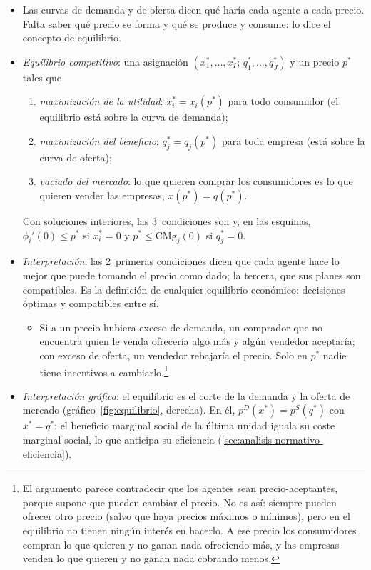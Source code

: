 \documentclass[11pt]{article}
\begin{document}
\begin{itemize}
\item Las curvas de demanda y de oferta dicen qué haría cada agente a cada precio. Falta saber qué precio se forma y qué se produce y consume: lo dice el concepto de equilibrio.
\item \emph{Equilibrio competitivo}: una asignación $(x_1^*,\dots,x_I^*;\,q_1^*,\dots,q_J^*)$ y un precio $p^*$ tales que
  \begin{enumerate}
  \item \emph{maximización de la utilidad}: $x_i^*=x_i(p^*)$ para todo consumidor (el equilibrio está sobre la curva de demanda);
  \item \emph{maximización del beneficio}: $q_j^*=q_j(p^*)$ para toda empresa (está sobre la curva de oferta);
  \item \emph{vaciado del mercado}: lo que quieren comprar los consumidores es lo que quieren vender las empresas, $x(p^*)=q(p^*)$.
  \end{enumerate}
  Con soluciones interiores, las 3~condiciones son
  y, en las esquinas, $\phi_i'(0)\leq p^*$ si $x_i^*=0$ y $p^*\leq\mathrm{CMg}_j(0)$ si $q_j^*=0$.
\item \emph{Interpretación}: las 2~primeras condiciones dicen que cada agente hace lo mejor que puede tomando el precio como dado; la tercera, que sus planes son compatibles. Es la definición de cualquier equilibrio económico: decisiones óptimas y compatibles entre sí.
  \begin{itemize}
  \item Si a un precio hubiera exceso de demanda, un comprador que no encuentra quien le venda ofrecería algo más y algún vendedor aceptaría; con exceso de oferta, un vendedor rebajaría el precio. Solo en $p^*$ nadie tiene incentivos a cambiarlo.\footnote{El argumento parece contradecir que los agentes sean precio-aceptantes, porque supone que pueden cambiar el precio. No es así: siempre pueden ofrecer otro precio (salvo que haya precios máximos o mínimos), pero en el equilibrio no tienen ningún interés en hacerlo. A ese precio los consumidores compran lo que quieren y no ganan nada ofreciendo más, y las empresas venden lo que quieren y no ganan nada cobrando menos.}
  \end{itemize}
\item \emph{Interpretación gráfica}: el equilibrio es el corte de la demanda y la oferta de mercado (gráfico~\ref{fig:equilibrio}, derecha). En él, $p^D(x^*)=p^S(q^*)$ con $x^*=q^*$: el beneficio marginal social de la última unidad iguala su coste marginal social, lo que anticipa su eficiencia (\ref{sec:analisis-normativo-eficiencia}).
\end{itemize}
\end{document}
